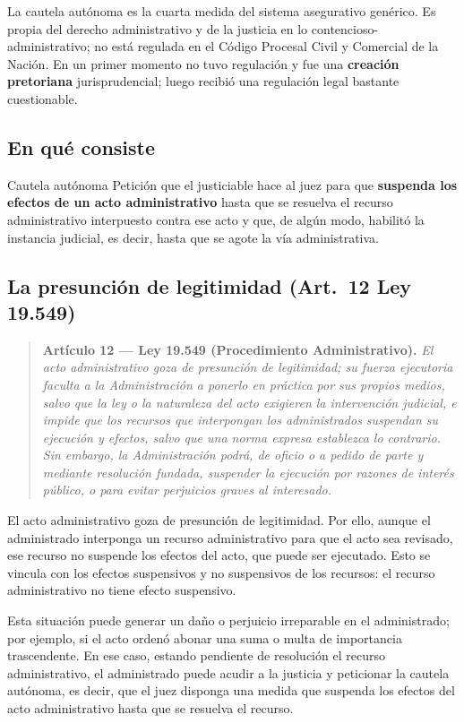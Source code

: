 \documentclass[12pt,oneside]{book}
\begin{document}
La cautela autónoma es la cuarta medida del sistema asegurativo genérico. Es propia del derecho administrativo y de la justicia en lo contencioso-administrativo; no está regulada en el Código Procesal Civil y Comercial de la Nación. En un primer momento no tuvo regulación y fue una \textbf{creación pretoriana} jurisprudencial; luego recibió una regulación legal bastante cuestionable.

\subsection{En qué consiste}

\begin{definition}{Cautela autónoma}
Petición que el justiciable hace al juez para que \textbf{suspenda los efectos de un acto administrativo} hasta que se resuelva el recurso administrativo interpuesto contra ese acto y que, de algún modo, habilitó la instancia judicial, es decir, hasta que se agote la vía administrativa.
\end{definition}

\subsection{La presunción de legitimidad (Art.~12 Ley 19.549)}

\begin{quote}
\small
\textbf{Artículo 12 --- Ley 19.549 (Procedimiento Administrativo).} \textit{El acto administrativo goza de presunción de legitimidad; su fuerza ejecutoria faculta a la Administración a ponerlo en práctica por sus propios medios, salvo que la ley o la naturaleza del acto exigieren la intervención judicial, e impide que los recursos que interpongan los administrados suspendan su ejecución y efectos, salvo que una norma expresa establezca lo contrario. Sin embargo, la Administración podrá, de oficio o a pedido de parte y mediante resolución fundada, suspender la ejecución por razones de interés público, o para evitar perjuicios graves al interesado.}
\end{quote}

El acto administrativo goza de presunción de legitimidad. Por ello, aunque el administrado interponga un recurso administrativo para que el acto sea revisado, ese recurso no suspende los efectos del acto, que puede ser ejecutado. Esto se vincula con los efectos suspensivos y no suspensivos de los recursos: el recurso administrativo no tiene efecto suspensivo.

Esta situación puede generar un daño o perjuicio irreparable en el administrado; por ejemplo, si el acto ordenó abonar una suma o multa de importancia trascendente. En ese caso, estando pendiente de resolución el recurso administrativo, el administrado puede acudir a la justicia y peticionar la cautela autónoma, es decir, que el juez disponga una medida que suspenda los efectos del acto administrativo hasta que se resuelva el recurso.
\end{document}
